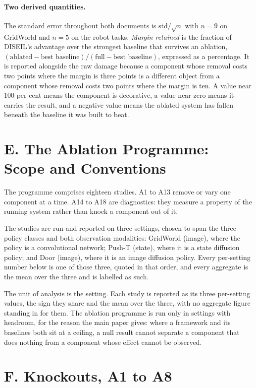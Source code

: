 \documentclass[letterpaper]{article}
\begin{document}
\paragraph{Two derived quantities.} The standard error throughout both documents is
$\mathrm{std}/\sqrt{n}$ with $n = 9$ on GridWorld and $n = 5$ on the robot tasks.
\emph{Margin retained} is the fraction of DISEIL's advantage over the strongest
baseline that survives an ablation,
$(\text{ablated} - \text{best baseline}) / (\text{full} - \text{best baseline})$,
expressed as a percentage. It is reported alongside the raw damage because a component
whose removal costs two points where the margin is three points is a different object
from a component whose removal costs two points where the margin is ten. A value near
100 per cent means the component is decorative, a value near zero means it carries the
result, and a negative value means the ablated system has fallen beneath the baseline
it was built to beat.

\section{E. The Ablation Programme: Scope and Conventions}

The programme comprises eighteen studies. A1 to A13 remove or vary one component at a
time. A14 to A18 are diagnostics: they measure a property of the running system rather
than knock a component out of it.

The studies are run and reported on three settings, chosen to span the three policy
classes and both observation modalities: GridWorld (image), where the policy is a
convolutional network; Push-T (state), where it is a state diffusion policy; and Door
(image), where it is an image diffusion policy. Every per-setting number below is one
of those three, quoted in that order, and every aggregate is the mean over the three
and is labelled as such.

The unit of analysis is the setting. Each study is reported as its three per-setting
values, the sign they share and the mean over the three, with no aggregate figure
standing in for them. The ablation programme is
run only in settings with headroom, for the reason the main paper gives: where a
framework and its baselines both sit at a ceiling, a null result cannot separate a
component that does nothing from a component whose effect cannot be observed.

\section{F. Knockouts, A1 to A8}
\end{document}
